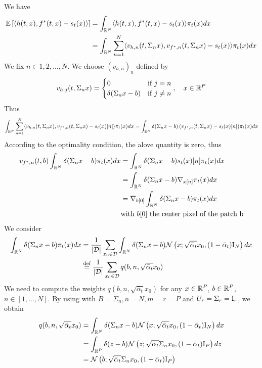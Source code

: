 \documentclass[a4paper,10pt]{article}
\begin{document}
We have
\begin{align*}
    \mathbb{E} \left[ {\langle h(t,x),f^*(t,x) -s_t(x)\rangle} \right] &= \int_{\mathbb{R}^N} \langle h(t,x),f^*(t,x)-s_t(x) \rangle \pi_t(x) dx\\
    &= \int_{\mathbb{R}^N} \sum_{n=1}^{N}\langle v_{h,n}(t,\Sigma_nx),v_{f^*,n}(t,\Sigma_nx)-s_t(x) \rangle \pi_t(x) dx\\
\end{align*}
We fix $n \in {1,2,\dots,N}$. We choose $(v_{h,n})_n$ defined by
\begin{equation*}
    v_{h,j}(t,\Sigma_n x) = 
    \begin{cases}
        0 & \text{if } j = n \\
        \delta(\Sigma_nx - b) & \text{if } j \neq n
    \end{cases}
    ,\quad x \in \mathbb{R}^P
\end{equation*}
Thus
\begin{equation*}
    \int_{\mathbb{R}^N} \sum_{n=1}^{N}\langle v_{h,n}(t,\Sigma_nx),v_{f^*,n}(t,\Sigma_nx)-s_t(x)[n] \rangle \pi_t(x) dx =  \int_{\mathbb{R}^N} \delta(\Sigma_nx -b)\,(v_{f^*,n}(t,\Sigma_nx)-s_t(x)[n])  \pi_t(x) dx
\end{equation*}
According to the optimality condition, the alove quantity is zero, thus
\begin{align*}
    v_{f^*,n}(t,b)\int_{\mathbb{R}^N} \delta(\Sigma_nx -b) \pi_t(x) dx &= \int_{\mathbb{R}^N} \delta(\Sigma_nx -b) s_t(x)[n]\pi_t(x) dx \\
    &= \int_{\mathbb{R}^N} \delta(\Sigma_nx -b) \nabla_{x[n]}\pi_t(x) dx\\
    &= \nabla_{b[0]} \int_{\mathbb{R}^N} \delta(\Sigma_nx -b) \pi_t(x) dx\\
    & \text{with } b[0] \text{ the center pixel of the patch b}
\end{align*}
We consider
\begin{align*}
    \int_{\mathbb{R}^N} \delta(\Sigma_nx -b) \pi_t(x) dx &= \frac{1}{|\mathcal{D}|} \sum_{x_0  \in \mathcal{D}} \int_{\mathbb{R}^N} \delta(\Sigma_nx -b) \mathcal{N}\left( {x; \sqrt{\bar \alpha_t} x_0, (1-\bar\alpha_t) \mathrm{I}_N} \right) dx\\
    & \overset{\text{\scriptsize{def}}}{=} \frac{1}{|\mathcal{D}|} \sum_{x_0  \in \mathcal{D}} q(b, n, \sqrt{\bar\alpha_t}x_0)
\end{align*}
We need to compute the weights $q(b, n, \sqrt{\bar\alpha_t}x_0)$ for any $x \in \mathbb{R}^P$, $b\in \mathbb{R}^P$, $n \in [1, \dots, N]$. By using  with $B = \Sigma_n, n = N, m = r =P$ and $U_r = \Sigma_r = \mathrm{I}_r$, we obtain 
\begin{align*}
    q(b, n, \sqrt{\bar\alpha_t}x_0)&=\int_{\mathbb{R}^N} \delta(\Sigma_nx -b) \mathcal{N}\left( {x; \sqrt{\bar \alpha_t} x_0, (1-\bar\alpha_t) \mathrm{I}_N} \right) dx\\
    &= \int_{\mathbb{R}^P} \delta(z -b) \mathcal{N}\left( {z; \sqrt{\bar \alpha_t} \Sigma_n x_0, (1-\bar\alpha_t) \mathrm{I}_P} \right) dz\\
    &= \mathcal{N}\left( {b; \sqrt{\bar \alpha_t} \Sigma_n x_0, (1-\bar\alpha_t) \mathrm{I}_P} \right)
\end{align*}
\end{document}
